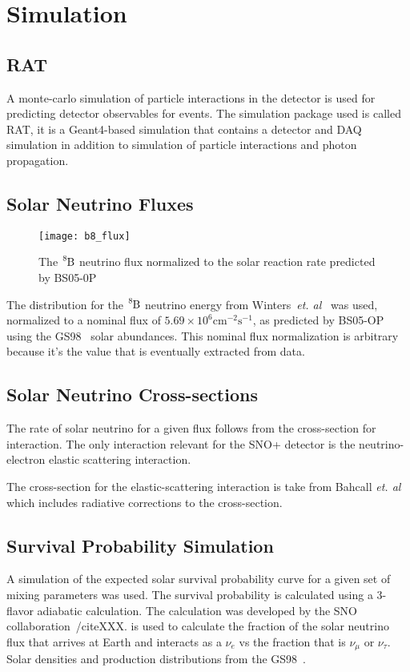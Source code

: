 \section{Simulation}


\subsection{RAT}
A monte-carlo simulation of particle interactions in the detector is used
for predicting detector observables for events.
The simulation package used is called RAT, it is a Geant4-based simulation that
contains a detector and DAQ simulation in addition to simulation of particle
interactions and photon propagation.


\subsection{Solar Neutrino Fluxes}
\begin{figure}[htbp]
\centering
\texttt{[image: b8\_flux]}
\caption[Expected $\ce{^{8}B}$ Flux]{The $\ce{^{8}B}$ neutrino flux
normalized to the solar reaction rate predicted by BS05-0P~\cite{bs05op}}
\label{fig:b8_flux}
\end{figure}
The distribution for the $\ce{^{8}B}$ neutrino energy from Winters~\textit{et. al}~\cite{winterspectrum}
was used, normalized to a nominal flux of $5.69\times10^{6}\mathrm{cm}^{-2}\mathrm{s}^{-1}$,
as predicted by BS05-OP~\cite{bs05op} using the GS98~\cite{gs98} solar
abundances.
This nominal flux normalization is arbitrary because it's the value that is
eventually extracted from data.

\subsection{Solar Neutrino Cross-sections}
The rate of solar neutrino for a given flux follows from the cross-section for
interaction. The only interaction relevant for the SNO+ detector is the
neutrino-electron elastic scattering interaction.

The cross-section for the elastic-scattering interaction is take from Bahcall
\textit{et. al}~\cite{escrosssec} which includes radiative corrections to
the cross-section.

\subsection{Survival Probability Simulation}
A simulation of the expected solar survival probability curve for a given
set of mixing parameters was used.
The survival probability is calculated using a
3-flavor adiabatic calculation. The calculation was developed by the
SNO collaboration~/cite{XXX}.
is used to calculate the fraction of the solar neutrino flux that arrives
at Earth and interacts as a $\nu_{e}$ vs the fraction that is $\nu_{\mu}$ or $\nu_{\tau}$.
Solar densities and production distributions from the GS98~\cite{gs98}.

